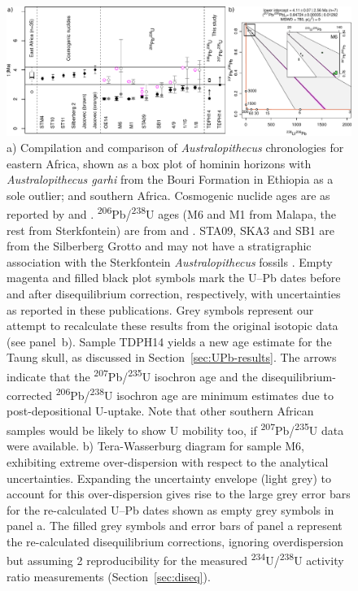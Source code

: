 \documentclass[11pt]{article}
\begin{document}
\begin{figure}[!ht]
  \centering
  \includegraphics[width=\textwidth]{EastVsSouth2.pdf}
  \caption{a) Compilation and comparison of \emph{Australopithecus}
    chronologies for eastern Africa, shown as a box plot of hominin
    horizons \citep{maxwell2018} with \emph{Australopithecus garhi}
    from the Bouri Formation in Ethiopia as a sole outlier; and
    southern Africa. Cosmogenic nuclide ages are as reported by
    \citet{partridge2003} and \citet{granger2015,granger2022}.
    \textsuperscript{206}Pb/\textsuperscript{238}U ages (M6 and M1
    from Malapa, the rest from Sterkfontein) are from
    \citet{walker2006} and \citet{pickering2019}. STA09, SKA3 and SB1
    are from the Silberberg Grotto and may not have a stratigraphic
    association with the Sterkfontein \emph{Australopithecus} fossils
    \citep{bruxelles2019}. Empty magenta and filled black plot symbols
    mark the U--Pb dates before and after disequilibrium correction,
    respectively, with uncertainties as reported in these
    publications.  Grey symbols represent our attempt to recalculate
    these results from the original isotopic data (see panel~b).
    Sample TDPH14 yields a new age estimate for the Taung skull, as
    discussed in Section~\ref{sec:UPb-results}. The arrows indicate
    that the \textsuperscript{207}Pb/\textsuperscript{235}U isochron
    age and the disequilibrium-corrected
    \textsuperscript{206}Pb/\textsuperscript{238}U isochron age are
    minimum estimates due to post-depositional U-uptake. Note that
    other southern African samples would be likely to show U mobility
    too, if \textsuperscript{207}Pb/\textsuperscript{235}U data were
    available. b) Tera-Wasserburg diagram for sample M6, exhibiting
    extreme over-dispersion with respect to the analytical
    uncertainties. Expanding the uncertainty envelope (light grey) to
    account for this over-dispersion gives rise to the large grey
    error bars for the re-calculated U--Pb dates shown as empty grey
    symbols in panel a. The filled grey symbols and error bars of
    panel a represent the re-calculated disequilibrium corrections,
    ignoring overdispersion but assuming 2\permil{} reproducibility
    for the measured \textsuperscript{234}U/\textsuperscript{238}U
    activity ratio measurements (Section~\ref{sec:diseq}).}
  \label{fig:EastVsSouth}
\end{figure}
\end{document}
